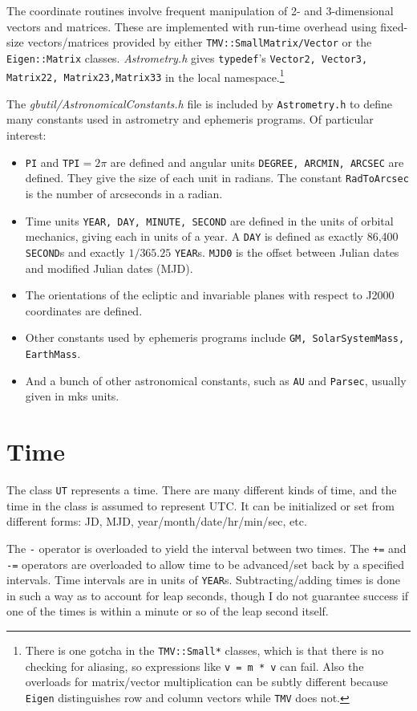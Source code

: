 \documentclass[11pt,preprint,flushrt]{aastex}
\begin{document}
The coordinate routines involve frequent manipulation of 2- and 3-dimensional vectors and matrices.  These are implemented with run-time overhead using fixed-size vectors/matrices provided by either \texttt{TMV::SmallMatrix/Vector} or the \texttt{Eigen::Matrix} classes.  
{\it Astrometry.h} gives {\tt typedef}'s  {\tt Vector2, Vector3, Matrix22, Matrix23,Matrix33} in the local namespace.\footnote{There is one gotcha in the {\tt TMV::Small*} classes, which is that there is no checking for aliasing, so expressions like {\tt v = m * v} can fail. Also the overloads for matrix/vector multiplication can be subtly different because \texttt{Eigen} distinguishes row and column vectors while \texttt{TMV} does not.}

The \textit{gbutil/AstronomicalConstants.h} file is included by {\tt Astrometry.h} to define many constants used in astrometry and ephemeris programs.  Of particular interest:
\begin{itemize}
\item {\tt PI} and {\tt TPI}$=2\pi$ are defined and angular units {\tt DEGREE, ARCMIN, ARCSEC} are defined.  They give the size of each unit in radians.  The constant {\tt RadToArcsec} is the number of arcseconds in a radian.
\item Time units {\tt YEAR, DAY, MINUTE, SECOND} are defined in the units of orbital mechanics, giving each in units of a year.  A {\tt DAY} is defined as exactly 86,400 {\tt SECOND}s and exactly $1/365.25$ {\tt YEAR}s.  {\tt MJD0} is the offset between Julian dates and modified Julian dates (MJD).
\item The orientations of the ecliptic and invariable planes with respect to J2000 coordinates are defined.
\item Other constants used by ephemeris programs include {\tt GM, SolarSystemMass, EarthMass}.
\item And a bunch of other astronomical constants, such as {\tt AU} and {\tt Parsec}, usually given in mks units.
\end{itemize}

\section{Time}
The class {\tt UT} represents a time.  There are many different kinds of time, and the time in the class is assumed to represent UTC.  It can be initialized or set from different forms: JD, MJD, year/month/date/hr/min/sec, etc.

The {\tt -} operator is overloaded to yield the interval between two times.  The {\tt +=} and {\tt -=} operators are overloaded to allow time to be advanced/set back by a specified intervals.  Time intervals are in units of {\tt YEAR}s. 
Subtracting/adding times is done in such a way as to account for leap
seconds, though I do not guarantee success if one of the times is within
a minute or so of the leap second itself.  
\end{document}
